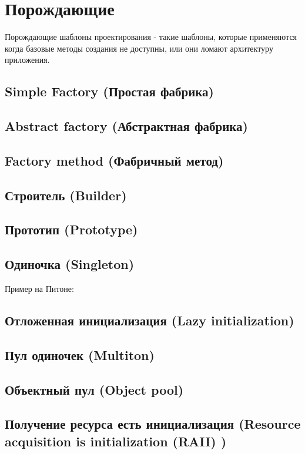 \section{Порождающие}

Порождающие шаблоны проектирования - такие шаблоны, которые применяются когда базовые методы создания не доступны, или они ломают архитектуру приложения.

\subsection{Simple Factory (Простая фабрика)}
\subsection{Abstract factory (Абстрактная фабрика)}
\subsection{Factory method (Фабричный метод)}
\subsection{Строитель (Builder)}
\subsection{Прототип (Prototype)}
\subsection{Одиночка (Singleton)}

Пример на Питоне:

\linenumbers
{}
\nolinenumbers

\subsection{Отложенная инициализация (Lazy initialization)}
\subsection{Пул одиночек (Multiton)}
\subsection{Объектный пул (Object pool)}
\subsection{Получение ресурса есть инициализация (Resource acquisition is initialization (RAII) )}

